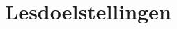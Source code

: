 \documentclass{vakinf}
\begin{document}
\maketitle
\toonidentificatie
\toonlesgegevens
\tooneindtermen %
\clearpage %
\toonvoorkennis
\toonsituering %
\toonbeginsituatie 
\toonbenodigdheden
\toonwerkpunten

\section*{Lesdoelstellingen}
\tooncognitievedoelen
\clearpage %
\toonaffectievedoelen
\toonvaardigheden

\toonlesindeling

\toonvisualisering
\toonevaluatie
\end{document}
